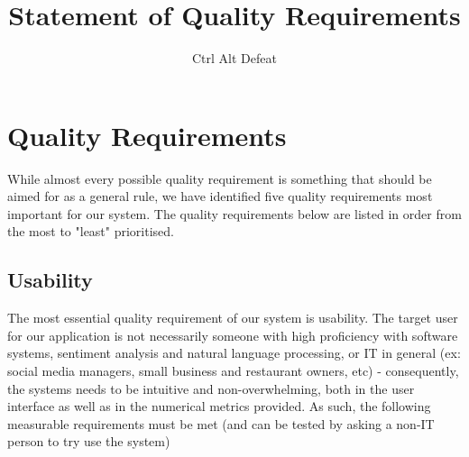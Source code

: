 \documentclass[12pt]{article}
\title{Statement of Quality Requirements}
\author{Ctrl Alt Defeat}
\begin{document}

\tableofcontents
\newpage

\newpage
\section{Quality Requirements}
While almost every possible quality requirement is something that should be aimed for as a general rule, we have identified five quality requirements most important for our system. The quality requirements below are listed in order from the most to "least" prioritised.

\subsection{Usability}
The most essential quality requirement of our system is usability. The target user for our application is not necessarily someone with high proficiency with software systems, sentiment analysis and natural language processing, or IT in general (ex: social media managers, small business and restaurant owners, etc) - consequently, the systems needs to be intuitive and non-overwhelming, both in the user interface as well as in the numerical metrics provided. As such, the following measurable requirements must be met (and can be tested by asking a non-IT person to try use the system)
\end{document}

